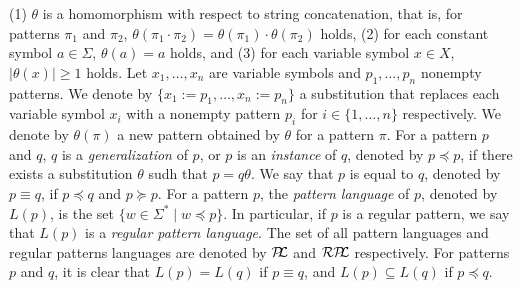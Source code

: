 (1) $\theta$ is a homomorphism with respect to string concatenation, that is, for patterns $\pi_{1}$ and $\pi_{2}$,
$\theta(\pi_{1} \cdot \pi_{2}) = \theta(\pi_{1}) \cdot \theta(\pi_{2})$ holds,
(2) for each constant symbol $a \in \Sigma$, $\theta(a) = a$ holds,
and (3) for each variable symbol $x \in X$, $|\theta(x)| \geq 1$ holds.
Let $x_{1},\ldots,x_{n}$ are variable symbols and $p_{1},\ldots,p_{n}$ nonempty patterns.
We denote by $\{x_{1}:=p_{1},\ldots,x_{n}:=p_{n}\}$ a substitution that replaces each variable symbol $x_{i}$
with a nonempty pattern $p_{i}$ for $i \in \{1,\ldots,n\}$ respectively.
We denote by $\theta(\pi)$ a new pattern obtained by $\theta$ for a pattern $\pi$.
%
For a pattern $p$ and $q$,
$q$ is a \textit{generalization} of $p$, or $p$ is an \textit{instance} of $q$, denoted by $p \preceq p$,
if there exists a substitution $\theta$ sudh that $p = q\theta$.
We say that $p$ is equal to $q$, denoted by $p \equiv q$, if $p \preceq q$ and $p \succeq p$.
%
%
For a pattern $p$, the \textit{pattern language} of $p$, denoted by $L(p)$, is the set $\{w \in \Sigma^{\ast} \mid w \preceq p\}$.
In particular, if $p$ is a regular pattern, we say that $L(p)$ is a \textit{regular pattern language}.
The set of all pattern languages and regular patterns languages are denoted by $\mathcal{P\!\!L}$ and $\mathcal{RP\!\!L}$ respectively.
For patterns $p$ and $q$, it is clear that $L(p) = L(q)$ if $p \equiv q$, and $L(p) \subseteq L(q)$ if $p \preceq q$.
